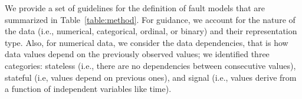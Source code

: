We provide a set of guidelines for the definition of fault models that
are summarized in Table~\ref{table:method}.
For guidance,
we account for the nature of the data (i.e., numerical, categorical, ordinal, or binary) and their representation type.
Also, for numerical data,
we consider
the data dependencies, that is how data values depend on the previously observed values; we identified three categories: stateless (i.e., there are no dependencies between consecutive values), stateful (i.e, values depend on previous ones), and signal (i.e., values derive from a function of independent variables like time).



